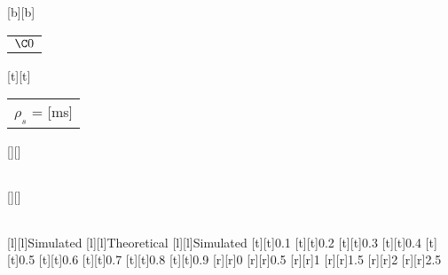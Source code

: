 %    
%
%
%
[b][b]{\fontsize{11}{16.5}\selectfont \color[rgb]{0,0,0}\setlength{\tabcolsep}{0pt}\begin{tabular}{c}$\C0$\end{tabular}}%
[t][t]{\fontsize{11}{16.5}\selectfont \color[rgb]{0,0,0}\setlength{\tabcolsep}{0pt}\begin{tabular}{c}$\rho_s$ = [ms]\end{tabular}}%
[][]{\fontsize{10}{15}\selectfont \color[rgb]{0,0,0}\setlength{\tabcolsep}{0pt}\begin{tabular}{c} \end{tabular}}%
[][]{\fontsize{10}{15}\selectfont \color[rgb]{0,0,0}\setlength{\tabcolsep}{0pt}\begin{tabular}{c} \end{tabular}}%
[l][l]{\fontsize{9}{13.5}\selectfont \color[rgb]{0,0,0}Simulated}%
[l][l]{\fontsize{9}{13.5}\selectfont \color[rgb]{0,0,0}Theoretical}%
[l][l]{\fontsize{9}{13.5}\selectfont \color[rgb]{0,0,0}Simulated}%
%
\fontsize{9}{13.5}%
\selectfont%
%
[t][t]{0.1}%
[t][t]{0.2}%
[t][t]{0.3}%
[t][t]{0.4}%
[t][t]{0.5}%
[t][t]{0.6}%
[t][t]{0.7}%
[t][t]{0.8}%
[t][t]{0.9}%
%
[r][r]{0}%
[r][r]{0.5}%
[r][r]{1}%
[r][r]{1.5}%
[r][r]{2}%
[r][r]{2.5}%
%
%
